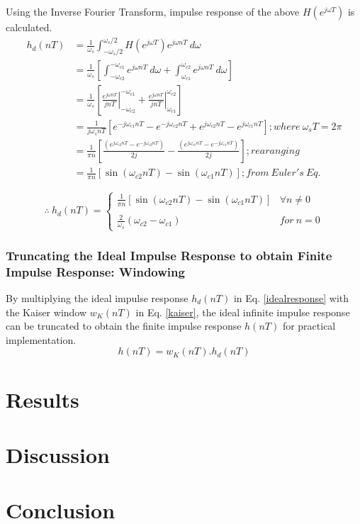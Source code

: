 \documentclass[a4paper,11pt]{article}%
\begin{document}
Using the Inverse Fourier Transform, impulse response of the above $H(e^{j\omega T})$ is calculated. 
\[
\begin{split}
	h_d(nT) &=\frac{1}{\omega_s}\int_{-\omega_s/2}^{\omega_s/2} H(e^{j\omega T})e^{j\omega nT}~d\omega\\
	&=\frac{1}{\omega_s}\left[\int_{-\omega_{c2}}^{-\omega_{c1}} e^{j\omega nT} ~d\omega+ \int_{\omega_{c1}}^{\omega_{c2}} e^{j\omega nT}~ d\omega\right]\\
	&=\frac{1}{\omega_s} \left[ \left.\frac{e^{j\omega nT}}{jn T}\right|_{-\omega_{c2}}^{-\omega_{c1}} + \left.\frac{e^{j\omega nT}}{jn T}\right|_{\omega_{c1}}^{\omega_{c2}} \right]\\
	&= \frac{1}{j\omega_s nT} \left[  e^{-j\omega_{c1}nT} - e^{-j\omega_{c2}nT}  +  e^{j\omega_{c2}nT} - e^{j\omega_{c1}nT}  \right] ; where~\omega_sT = 2\pi\\
	&= \frac{1}{\pi n}\left[ \frac{(e^{j\omega_{c2}nT} - e^{-j\omega_{c2}nT})}{2j} - \frac{(e^{j\omega_{c1}nT} - e^{-j\omega_{c1}nT})}{2j}  \right] ; rearanging\\
	&=	\frac{1}{\pi n}\left[   \sin(\omega_{c2}nT) - \sin(\omega_{c1}nT)  \right]; from~ Euler's ~Eq.  
\end{split}
\]

\begin{equation}
	\therefore ~ h_d(nT) = \begin{cases}
		\frac{1}{\pi n}\left[   \sin(\omega_{c2}nT) - \sin(\omega_{c1}nT)  \right] & \forall n \ne 0\\
		&\\
		\frac{2}{\omega_s}\left( \omega_{c2} - \omega_{c1}\right)& for~ n = 0
	\end{cases}
\label{idealresponse}
\end{equation}


\subsubsection{Truncating the Ideal Impulse Response to obtain Finite Impulse Response: Windowing}

By multiplying the ideal impulse response $h_d(nT)$ in Eq. \eqref{idealresponse} with the Kaiser window $w_K(nT)$ in Eq. \eqref{kaiser}, the ideal infinite impulse response can be truncated to obtain the finite impulse response $h(nT)$ for practical implementation.
\begin{equation}
h(nT) = 	w_K(nT).h_d(nT)
\end{equation}

\section{Results}
\section{Discussion}
\section{Conclusion}
%


\pagebreak



\end{document}
